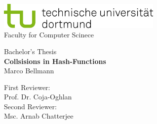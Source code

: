 \begin{titlepage}
    \vspace*{-2cm}
    \newlength{\links}
    \setlength{\links}{-1.5cm}
    \sffamily
    \hspace*{\links}
    \begin{minipage}{12.5cm}
        
        \includegraphics[width=8cm]{bilder/tud_logo_rgb}\\
        Faculty for Computer Scinece 

    \end{minipage}

    \vspace*{4cm}

    \hspace*{\links}
    \hspace*{-0.2cm}
        \large
        \begin{center}
            {\Large Bachelor's Thesis} \\
            \vspace*{0.5cm}
            {\LARGE
            \textbf{Collsisions in Hash-Functions} \\
            }
            \vspace*{0.5cm}
            Marco Bellmann\\
        \end{center}
    \normalsize
    \vspace*{7.5cm}



    \hspace*{\links}
        \center
        First Reviewer: \\
        Prof. Dr. Coja-Oghlan \\
        \vspace*{0.5cm}
        Second Reviewer: \\
        Msc. Arnab Chatterjee \\


\end{titlepage}
